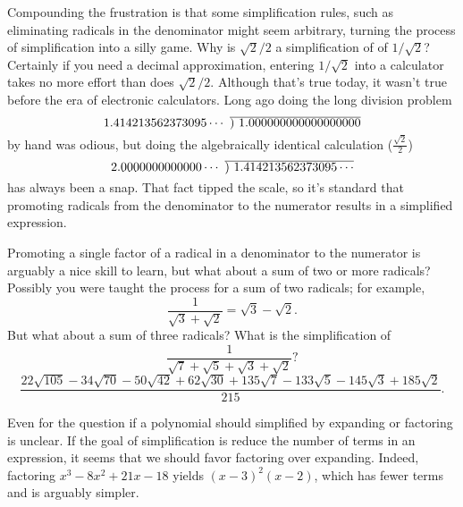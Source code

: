\documentclass[12pt,fleqn]{article}
\newcommand\showdiv[1]{\overline{\smash{)}#1}}
\begin{document}
{\begin{comment}
You needn't be especially cynical to speculate that the only
reason for the requirement of simplified answers is to reduce the 
teacher's burden of grading papers--it is much easier to simply mark 
any answer that isn't visually identical to the answer key as wrong.
\end{comment}
Compounding the frustration is that some simplification rules, such as eliminating radicals in the 
denominator might seem arbitrary, turning the process of simplification 
into a silly game. Why is $\sqrt{2}/2$ a simplification of 
of $1/\sqrt{2}$? Certainly if you need a decimal approximation, entering
$1/\sqrt{2}$ into a calculator takes no more effort than does $\sqrt{2}/2$. Although
that's true today, it wasn't true before the era of electronic calculators. Long
ago doing the long division problem 
\[
   1.414213562373095\cdots \, \, \showdiv{\, \, 1.000000000000000000}
\]
by hand was odious, but doing the algebraically identical calculation 
(\(\frac{\sqrt{2}}{2} \))
\[
   2.0000000000000\cdots \,\, \showdiv{\, \, 1.414213562373095\cdots}
 \]
 has always been a snap. That fact tipped the scale, so it's standard that promoting
 radicals from the denominator to the numerator results in a simplified
 expression.

 Promoting a single factor of a radical in a denominator to the numerator
 is arguably a nice skill to learn, but what about a sum of two or more
 radicals? Possibly you were taught the process for a sum of two radicals; for
 example,
 \begin{equation}
   \frac{1}{\sqrt{3}+\sqrt{2}} = \sqrt{3}-\sqrt{2}.
 \end{equation}
But what about a sum of three radicals? What is the simplification of
\begin{equation}
   \frac{1}{\sqrt{7}+\sqrt{5}+\sqrt{3}+\sqrt{2}} \mbox{?}
\end{equation}
\begin{equation}
   \frac{22 \sqrt{105}- 34 \sqrt{70}- 50 \sqrt{42}+62 \sqrt{30}+135 \sqrt{7}- 133 \sqrt{5}-145 \sqrt{3}+185 \sqrt{2}}{215}.
\end{equation}


 Even for the question if a polynomial should simplified by expanding
 or factoring is unclear. If the goal of simplification is reduce the
 number of terms in an expression, it seems that we should favor 
 factoring over expanding. Indeed, factoring ${{x}^{3}}-8 {{x}^{2}}+21 x-18$
 yields ${{\left( x-3\right) }^{2}} \left( x-2\right)$, which has fewer
 terms and is arguably simpler. 

}
\end{document}
